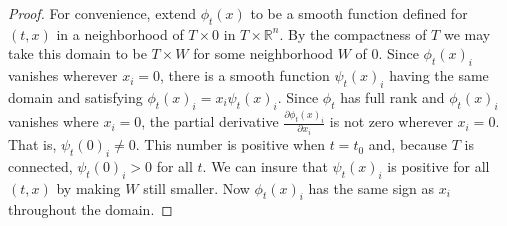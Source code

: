 \documentclass[11pt]{amsart}
\theoremstyle{definition}
\numberwithin{equation}{section}
\numberwithin{figure}{section}
\newcommand{\R}{\mathbb R}
\begin{document}
\begin{proof}


%	
	For convenience, extend $\phi_t(x)$ to be a smooth function defined for $(t,x)$ in a neighborhood of $T\times 0$ in $T\times \R^n$. By the compactness of $T$ we may take this domain to be $T\times W$ for some neighborhood $W$ of $0$. Since $\phi_t(x)_i$ vanishes wherever $x_i=0$, there is a smooth function $\psi_t(x)_i$ having the same domain and satisfying $\phi_t(x)_i=x_i\psi_t(x)_i$. Since $\phi_t$ has full rank and $\phi_t(x)_i$ vanishes where $x_i=0$, the partial derivative $\frac{\partial \phi_t(x)_i}{\partial x_i}$ is not zero wherever $x_i=0$. That is, $\psi_t(0)_i\neq 0$. This number is positive when $t=t_0$ and, because $T$ is connected, $\psi_t(0)_i>0$ for all $t$. We can insure that $\psi_t(x)_i$ is positive for all $(t,x)$ by making $W$ still smaller. Now $\phi_t(x)_i$ has the same sign as $x_i$ throughout the domain.
	

\end{proof}
\end{document}
